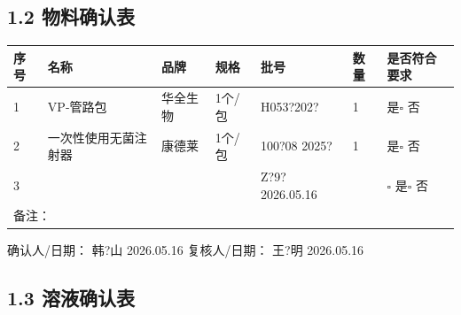 \documentclass[UTF8,10pt,a4paper,fontset=fandol]{ctexart}
\newcommand{\fieldvalue}[1]{#1}
\newcommand{\handwritten}[1]{#1}
\begin{document}
\subsection{1.2 物料确认表}

\begin{tabularx}{\textwidth}{|p{0.7cm}|X|p{1.5cm}|p{1.4cm}|p{2.4cm}|p{0.9cm}|p{1.5cm}|}
\hline
序号 & 名称 & 品牌 & 规格 & 批号 & 数量 & 是否符合要求 \\
\hline
1 & VP-管路包 & 华全生物 & 1个/包 &
\fieldvalue{\handwritten{H053?202?}} &
\fieldvalue{\handwritten{1}} &
\fieldvalue{是}\quad $\square$ 否 \\
\hline
2 & 一次性使用无菌注射器 & 康德莱 & 1个/包 &
\fieldvalue{\handwritten{100?08 2025?}} &
\fieldvalue{\handwritten{1}} &
\fieldvalue{是}\quad $\square$ 否 \\
\hline
3 & & & &
\fieldvalue{\handwritten{Z?9? 2026.05.16}} &
 &
$\square$ 是\quad $\square$ 否 \\
\hline
\multicolumn{7}{|l|}{备注：\hspace{12cm}}\\
\hline
\end{tabularx}

确认人/日期：
\fieldvalue{\handwritten{韩?山}}
\quad
\fieldvalue{\handwritten{2026.05.16}}
\qquad
复核人/日期：
\fieldvalue{\handwritten{王?明}}
\quad
\fieldvalue{\handwritten{2026.05.16}}

\subsection{1.3 溶液确认表}
\end{document}

